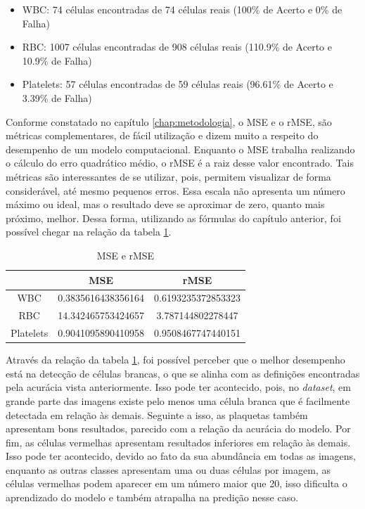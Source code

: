 \begin{itemize}
    \item WBC: 74 células encontradas de 74 células reais (100\% de Acerto e 0\% de Falha)
    \item RBC: 1007 células encontradas de 908 células reais (110.9\% de Acerto e 10.9\% de Falha)
    \item Platelets: 57 células encontradas de 59 células reais (96.61\% de Acerto e 3.39\% de Falha)
\end{itemize}

Conforme constatado no capítulo \ref{chap:metodologia}, o MSE e o rMSE, são métricas complementares, de fácil utilização e dizem muito a respeito do desempenho de um modelo computacional. Enquanto o MSE trabalha realizando o cálculo do erro quadrático médio, o rMSE é a raiz desse valor encontrado. Tais métricas são interessantes de se utilizar, pois, permitem visualizar de forma considerável, até mesmo pequenos erros. Essa escala não apresenta um número máximo ou ideal, mas o resultado deve se aproximar de zero, quanto mais próximo, melhor. Dessa forma, utilizando as fórmulas do capítulo anterior, foi possível chegar na relação da tabela \ref{tbl:mse}.

\begin{table}[!htb]
	\centering
	\caption{MSE e rMSE}
	\label{tbl:mse}
	\begin{tabular}{|c|c|c|}
		\hline
		          & MSE                & rMSE               \\ \hline
		WBC       & 0.3835616438356164 & 0.6193235372853323 \\ \hline
		RBC       & 14.342465753424657 & 3.787144802278447  \\ \hline
		Platelets & 0.9041095890410958 & 0.9508467747440151 \\ \hline
	\end{tabular}
	\vspace{6pt}
\end{table}

Através da relação da tabela \ref{tbl:mse}, foi possível perceber que o melhor desempenho está na detecção de células brancas, o que se alinha com as definições encontradas pela acurácia vista anteriormente. Isso pode ter acontecido, pois, no \emph{dataset}, em grande parte das imagens existe pelo menos uma célula branca que é facilmente detectada em relação às demais. Seguinte a isso, as plaquetas também apresentam bons resultados, parecido com a relação da acurácia do modelo. Por fim, as células vermelhas apresentam resultados inferiores em relação às demais. Isso pode ter acontecido, devido ao fato da sua abundância em todas as imagens, enquanto as outras classes apresentam uma ou duas células por imagem, as células vermelhas podem aparecer em um número maior que 20, isso dificulta o aprendizado do modelo e também atrapalha na predição nesse caso.

